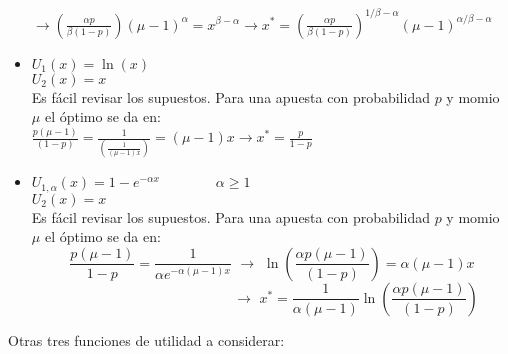 \begin{itemize}
  $\rightarrow{\displaystyle\left(\frac{\alpha p}{\beta(1-p)}\right)(\mu-1)^{\alpha}=x^{\beta-\alpha}\rightarrow x^*=\left(\frac{\alpha p}{\beta(1-p)}\right)^{1/\beta-\alpha}(\mu-1)^{\alpha/\beta-\alpha}}$
 
  \item $U_1(x)=\ln (x)$\\
  $U_2(x)=x$\\
 
  Es fácil revisar los supuestos. Para una apuesta con probabilidad $p$ y momio $\mu$ el óptimo se da en:\\
 
  ${\displaystyle \frac{p(\mu-1)}{(1-p)}=\frac{1}{(\frac{1}{(\mu-1) x})}=(\mu-1)x\rightarrow x^*=\frac{p}{1-p}}$\\
 
  \item $U_{1,\alpha}(x)=1-e^{-\alpha x}\qquad\qquad \alpha \ge 1$\\
  $U_2(x)=x$\\
 
  Es fácil revisar los supuestos. Para una apuesta con probabilidad $p$ y momio $\mu$ el óptimo se da en:\\
 
 \[{\displaystyle\frac{p(\mu-1)}{1-p}=\frac{1}{\alpha e^{-\alpha(\mu-1)x}}\,\,\rightarrow \,\,\ln \left(\frac{\alpha p(\mu-1)}{(1-p)}\right)=\alpha(\mu-1)x}\]
 \[\qquad\qquad\qquad\qquad\qquad\qquad\rightarrow\,\, x^*={\displaystyle\frac{1}{\alpha (\mu-1)}\ln \left(\frac{\alpha p(\mu-1)}{(1-p)}\right)}\]
 \end{itemize}

 Otras tres funciones de utilidad a considerar:

